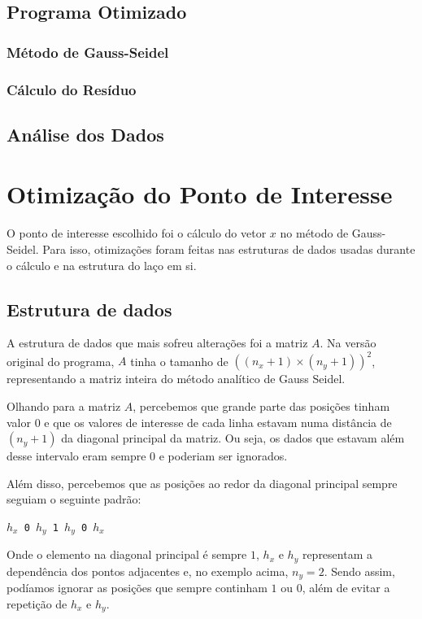 \documentclass[12pt]{article}
\begin{document}
	\subsection{Programa Otimizado}
		\subsubsection{Método de Gauss-Seidel}
		\subsubsection{Cálculo do Resíduo}

	\subsection{Análise dos Dados}

\newpage

\section{Otimização do Ponto de Interesse}

O ponto de interesse escolhido foi o cálculo do vetor $x$ no método de Gauss-Seidel.
Para isso, otimizações foram feitas nas estruturas de dados usadas durante o cálculo e na estrutura do laço em si.

	\subsection{Estrutura de dados}
	A estrutura de dados que mais sofreu alterações foi a matriz $A$.
	Na versão original do programa, $A$ tinha o tamanho de $((n_x+1)\times(n_y+1))^2$, representando a matriz inteira do método analítico de Gauss Seidel.
	
	Olhando para a matriz $A$, percebemos que grande parte das posições tinham valor $0$ e que os valores de interesse de cada linha estavam numa distância de $(n_y+1)$ da diagonal principal da matriz.
	Ou seja, os dados que estavam além desse intervalo eram sempre $0$ e poderiam ser ignorados.
	
	Além disso, percebemos que as posições ao redor da diagonal principal sempre seguiam o seguinte padrão:
	
	\begin{center}
		\texttt{$h_x$ 0 $h_y$ 1 $h_y$ 0 $h_x$}
	\end{center}
	
	Onde o elemento na diagonal principal é sempre $1$, $h_x$ e $h_y$ representam a dependência dos pontos adjacentes e, no exemplo acima, $n_y=2$.
	Sendo assim, podíamos ignorar as posições que sempre continham $1$ ou $0$, além de evitar a repetição de $h_x$ e $h_y$.
	
\end{document}
